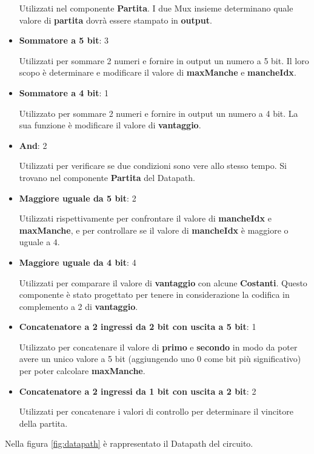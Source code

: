 \documentclass[a4paper]{article}
\begin{document}
\begin{itemize}
	      \noindent Utilizzati nel componente \textbf{Partita}. I due Mux insieme determinano quale valore di
	      \textbf{partita} dovrà essere stampato in \textbf{output}.
	\item \textbf{Sommatore a 5 bit}: 3

	      \noindent Utilizzati per sommare 2 numeri e fornire in output un numero a 5 bit.
	      Il loro scopo è determinare e modificare il valore di \textbf{maxManche} e \textbf{mancheIdx}.
	\item \textbf{Sommatore a 4 bit}: 1

	      \noindent Utilizzato per sommare 2 numeri e fornire in output un numero a 4 bit.
	      La sua funzione è modificare il valore di \textbf{vantaggio}.
	\item \textbf{And}: 2

	      \noindent Utilizzati per verificare se due condizioni sono vere allo stesso tempo. Si trovano nel componente \textbf{Partita} del Datapath.
	\item \textbf{Maggiore uguale da 5 bit}: 2

	      \noindent Utilizzati rispettivamente per confrontare il valore di \textbf{mancheIdx} e \textbf{maxManche},
	      e per controllare se il valore di \textbf{mancheIdx} è maggiore o uguale a \( 4 \).
	\item \textbf{Maggiore uguale da 4 bit}: 4

	      \noindent Utilizzati per comparare il valore di \textbf{vantaggio} con alcune \textbf{Costanti}. Questo
	      componente è stato progettato per tenere in considerazione la codifica in complemento a 2 di \textbf{vantaggio}.
	\item \textbf{Concatenatore a 2 ingressi da 2 bit con uscita a 5 bit}: 1

	      \noindent Utilizzato per concatenare il valore di \textbf{primo} e \textbf{secondo} in modo da poter
	      avere un unico valore a 5 bit (aggiungendo uno 0 come bit più significativo) per poter calcolare \textbf{maxManche}.
	\item \textbf{Concatenatore a 2 ingressi da 1 bit con uscita a 2 bit}: 2

	      \noindent Utilizzati per concatenare i valori di controllo per determinare il vincitore della partita.
\end{itemize}

\noindent Nella figura \ref{fig:datapath} è rappresentato il Datapath del circuito.
\end{document}
